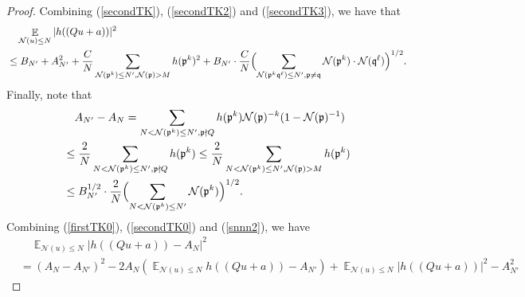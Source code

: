 \documentclass[11pt]{amsart}
\theoremstyle{definition}
\DeclareMathOperator*{\E}{\mathbb{E}}
\newcommand{\NN}{{\mathcal N}}
\newcommand{\mf}{\mathfrak}
\begin{document}
\begin{proof}
Combining (\ref{secondTK}), (\ref{secondTK2}) and (\ref{secondTK3}), we have that
\begin{equation}\label{secondTK0}
    \begin{split}
        &\quad \E_{\NN(u) \leq N}\vert h((Qu+a))\vert^{2}
        \\&\leq B_{N'}+A_{N'}^{2}+\frac{C}{N}\sum_{\NN(\mf p^{k})\leq N', \NN(\mf p)>M}h(\mf p^{k})^{2}+B_{N'}\cdot\frac{C}{N}\Bigl(\sum_{\NN(\mf p^{k}\mf q^{\ell})\leq N', \mf p\neq \mf q} \NN(\mf p^{k})\cdot \NN(\mf q^{\ell})\Bigr)^{1/2}.
    \end{split}
\end{equation}   
Finally, note that 
 \begin{equation}\label{snnn2}
    \begin{split}
        &\quad A_{N'}-A_{N}
        =\sum_{N<\NN(\mf p^{k})\leq N',\mf p\nmid Q}h(\mf p^{k})\NN(\mf p)^{-k}(1-\NN(\mf p)^{-1})
        \\&\leq \frac{2}{N}\sum_{N<\NN(\mf p^{k})\leq N',\mf p\nmid Q}h(\mf p^{k})
        \leq \frac{2}{N}\sum_{N<\NN(\mf p^{k})\leq N',\mf \NN(\mf p)>M}h(\mf p^{k})
        \\&\leq B_{N'}^{1/2}\cdot \frac{2}{N}\Bigl(\sum_{N<\NN(\mf p^{k})\leq N'}\NN(\mf p^{k})\Bigr)^{1/2}.
        \end{split}
\end{equation}
Combining %
(\ref{firstTK0}), (\ref{secondTK0}) and (\ref{snnn2}), we have
%
%
 \begin{equation}\label{snnn}
    \begin{split}
        &\quad \E_{\NN(u) \leq N}\left| h((Qu+a))-A_{N}\right|^{2}  
        \\&=(A_{N}-A_{N'})^{2}-2A_{N}(\E_{\NN(u) \leq N}h((Qu+a))-A_{N'})+\E_{\NN(u) \leq N}\vert h((Qu+a))\vert^{2}-A_{N'}^{2}

\end{split}
\end{equation}
\end{proof}
\end{document}
